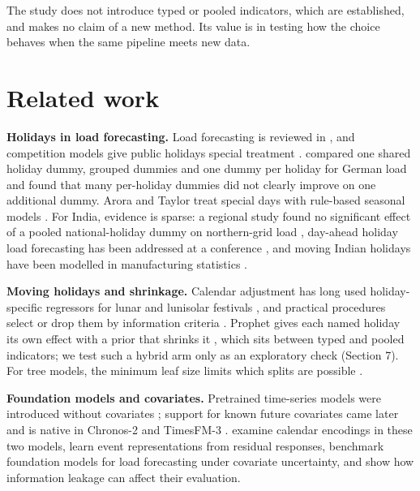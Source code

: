 \documentclass[review,12pt,authoryear]{elsarticle}
\begin{document}
The study does not introduce typed or pooled indicators, which are established, and makes no claim of a new method. Its value is in testing how the choice behaves when the same pipeline meets new data.

\section{Related work}

\textbf{Holidays in load forecasting.} Load forecasting is reviewed in \citep{hong2016}, and competition models give public holidays special treatment \citep{charlton2014,ziel2016}. \citet{ziel2018} compared one shared holiday dummy, grouped dummies and one dummy per holiday for German load and found that many per-holiday dummies did not clearly improve on one additional dummy. Arora and Taylor treat special days with rule-based seasonal models \citep{arora2018b,arora2013}. For India, evidence is sparse: a regional study found no significant effect of a pooled national-holiday dummy on northern-grid load \citep{banerjee2010}, day-ahead holiday load forecasting has been addressed at a conference \citep{fernandes2011}, and moving Indian holidays have been modelled in manufacturing statistics \citep{sanyal2017}.

\textbf{Moving holidays and shrinkage.} Calendar adjustment has long used holiday-specific regressors for lunar and lunisolar festivals \citep{liu1980,bell1983,findley1998}, and practical procedures select or drop them by information criteria \citep{lin2003,roberts2015}. Prophet gives each named holiday its own effect with a prior that shrinks it \citep{taylor2018}, which sits between typed and pooled indicators; we test such a hybrid arm only as an exploratory check (Section 7). For tree models, the minimum leaf size limits which splits are possible \citep{probst2019,lightgbm2026}.

\textbf{Foundation models and covariates.} Pretrained time-series models were introduced without covariates \citep{das2024,ansari2024,woo2024}; support for known future covariates came later \citep{ekambaram2024,pinedaarango2025} and is native in Chronos-2 and TimesFM-3 \citep{ansari2025b,jain2026}. \citet{kreusel2026} examine calendar encodings in these two models, \citet{alipour2025} learn event representations from residual responses, \citet{kaljevic2026} benchmark foundation models for load forecasting under covariate uncertainty, and \citet{meyer2025} show how information leakage can affect their evaluation.
\end{document}
